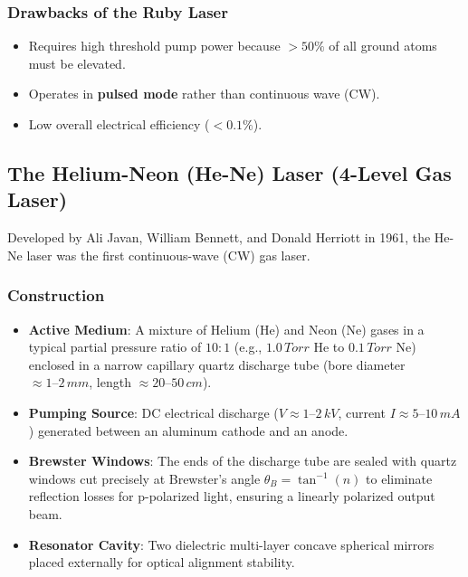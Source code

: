\subsubsection{Drawbacks of the Ruby Laser}
\begin{itemize}
    \item Requires high threshold pump power because $>50\%$ of all ground atoms must be elevated.
    \item Operates in \textbf{pulsed mode} rather than continuous wave (CW).
    \item Low overall electrical efficiency ($<0.1\%$).
\end{itemize}

\subsection{The Helium-Neon (He-Ne) Laser (4-Level Gas Laser)}
Developed by Ali Javan, William Bennett, and Donald Herriott in 1961, the He-Ne laser was the first continuous-wave (CW) gas laser.

\subsubsection{Construction}
\begin{itemize}
    \item \textbf{Active Medium}: A mixture of Helium (He) and Neon (Ne) gases in a typical partial pressure ratio of $10:1$ (e.g., $1.0\,\si{Torr}$ He to $0.1\,\si{Torr}$ Ne) enclosed in a narrow capillary quartz discharge tube (bore diameter $\approx 1\text{--}2\,\si{mm}$, length $\approx 20\text{--}50\,\si{cm}$).
    \item \textbf{Pumping Source}: DC electrical discharge ($V \approx 1\text{--}2\,\si{kV}$, current $I \approx 5\text{--}10\,\si{mA}$) generated between an aluminum cathode and an anode.
    \item \textbf{Brewster Windows}: The ends of the discharge tube are sealed with quartz windows cut precisely at Brewster's angle $\theta_B = \tan^{-1}(n)$ to eliminate reflection losses for p-polarized light, ensuring a linearly polarized output beam.
    \item \textbf{Resonator Cavity}: Two dielectric multi-layer concave spherical mirrors placed externally for optical alignment stability.
\end{itemize}

